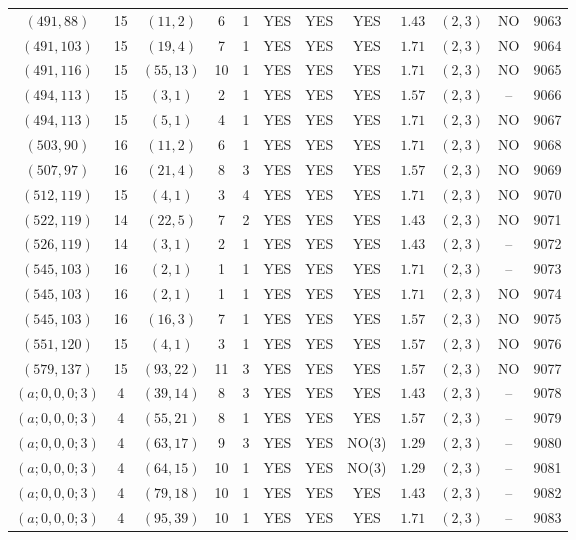 \begin{longtable}{|c|c|c|c|c|c|c|c|c|c|c|c|}
$(491,88)$ & 15 & $(11,2)$ & 6 & 1 & YES & YES & YES & $1.43$ & $(2,3)$ & NO & 9063\\
$(491,103)$ & 15 & $(19,4)$ & 7 & 1 & YES & YES & YES & $1.71$ & $(2,3)$ & NO & 9064\\
$(491,116)$ & 15 & $(55,13)$ & 10 & 1 & YES & YES & YES & $1.71$ & $(2,3)$ & NO & 9065\\
$(494,113)$ & 15 & $(3,1)$ & 2 & 1 & YES & YES & YES & $1.57$ & $(2,3)$ & -- & 9066\\
$(494,113)$ & 15 & $(5,1)$ & 4 & 1 & YES & YES & YES & $1.71$ & $(2,3)$ & NO & 9067\\
$(503,90)$ & 16 & $(11,2)$ & 6 & 1 & YES & YES & YES & $1.71$ & $(2,3)$ & NO & 9068\\
$(507,97)$ & 16 & $(21,4)$ & 8 & 3 & YES & YES & YES & $1.57$ & $(2,3)$ & NO & 9069\\
$(512,119)$ & 15 & $(4,1)$ & 3 & 4 & YES & YES & YES & $1.71$ & $(2,3)$ & NO & 9070\\
$(522,119)$ & 14 & $(22,5)$ & 7 & 2 & YES & YES & YES & $1.43$ & $(2,3)$ & NO & 9071\\
$(526,119)$ & 14 & $(3,1)$ & 2 & 1 & YES & YES & YES & $1.43$ & $(2,3)$ & -- & 9072\\
$(545,103)$ & 16 & $(2,1)$ & 1 & 1 & YES & YES & YES & $1.71$ & $(2,3)$ & -- & 9073\\
$(545,103)$ & 16 & $(2,1)$ & 1 & 1 & YES & YES & YES & $1.71$ & $(2,3)$ & NO & 9074\\
$(545,103)$ & 16 & $(16,3)$ & 7 & 1 & YES & YES & YES & $1.57$ & $(2,3)$ & NO & 9075\\
$(551,120)$ & 15 & $(4,1)$ & 3 & 1 & YES & YES & YES & $1.57$ & $(2,3)$ & NO & 9076\\
$(579,137)$ & 15 & $(93,22)$ & 11 & 3 & YES & YES & YES & $1.57$ & $(2,3)$ & NO & 9077\\
$(a;0,0,0;3)$ & 4 & $(39,14)$ & 8 & 3 & YES & YES & YES & $1.43$ & $(2,3)$ & -- & 9078\\
$(a;0,0,0;3)$ & 4 & $(55,21)$ & 8 & 1 & YES & YES & YES & $1.57$ & $(2,3)$ & -- & 9079\\
$(a;0,0,0;3)$ & 4 & $(63,17)$ & 9 & 3 & YES & YES & NO(3) & $1.29$ & $(2,3)$ & -- & 9080\\
$(a;0,0,0;3)$ & 4 & $(64,15)$ & 10 & 1 & YES & YES & NO(3) & $1.29$ & $(2,3)$ & -- & 9081\\
$(a;0,0,0;3)$ & 4 & $(79,18)$ & 10 & 1 & YES & YES & YES & $1.43$ & $(2,3)$ & -- & 9082\\
$(a;0,0,0;3)$ & 4 & $(95,39)$ & 10 & 1 & YES & YES & YES & $1.71$ & $(2,3)$ & -- & 9083\\

\end{longtable}

